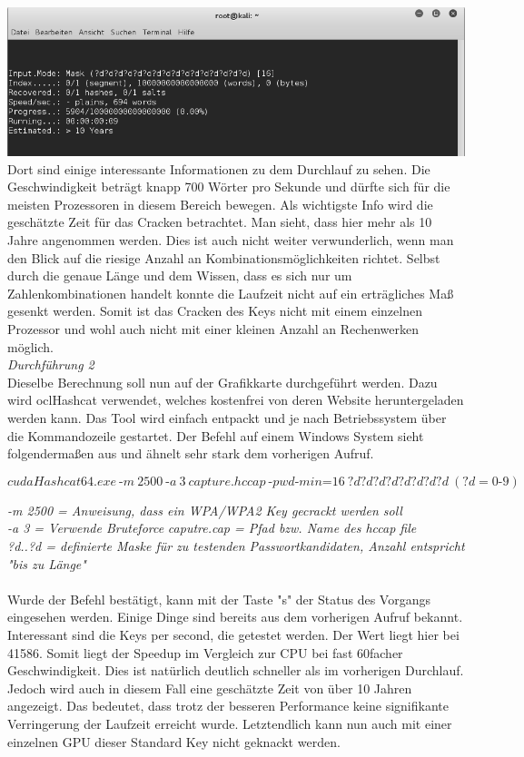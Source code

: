 \includegraphics[width=\textwidth]{bilder/wlan/wlan_screenshot_1.png}\\

Dort sind einige interessante Informationen zu dem Durchlauf zu sehen. Die Geschwindigkeit beträgt knapp 700 Wörter pro Sekunde und dürfte sich für die meisten Prozessoren in diesem Bereich bewegen.
Als wichtigste Info wird die geschätzte Zeit für das Cracken betrachtet. Man sieht, dass hier mehr als 10 Jahre angenommen werden. Dies ist auch nicht weiter verwunderlich, wenn man den Blick auf die riesige Anzahl an Kombinationsmöglichkeiten richtet. Selbst durch die genaue Länge und dem Wissen, dass es sich nur um Zahlenkombinationen handelt konnte die Laufzeit nicht auf ein erträgliches Maß gesenkt werden. Somit ist das Cracken des Keys nicht mit einem einzelnen Prozessor und wohl auch nicht mit einer kleinen Anzahl an Rechenwerken möglich.\\

\textit{Durchführung 2}\\

Dieselbe Berechnung soll nun auf der Grafikkarte durchgeführt werden. Dazu wird oclHashcat verwendet, welches kostenfrei von deren Website heruntergeladen werden kann. Das Tool wird einfach entpackt und je nach Betriebssystem über die Kommandozeile gestartet. Der Befehl auf einem Windows System sieht folgendermaßen aus und ähnelt sehr stark dem vorherigen Aufruf.

$$cudaHashcat64.exe~\text{-}m~2500~\text{-}a~3~capture.hccap~\text{-}pwd\text{-}min\text{=}16~?d?d?d?d?d?d?d?d~(?d = 0\text{-}9)$$

\textit{-m 2500 = Anweisung, dass ein WPA/WPA2 Key gecrackt werden soll}\\
\textit{-a 3 = Verwende Bruteforce}
\textit{caputre.cap = Pfad bzw. Name des hccap file}\\
\textit{?d..?d = definierte Maske für zu testenden Passwortkandidaten, Anzahl entspricht "bis zu Länge"\\}\\

Wurde der Befehl bestätigt, kann mit der Taste "s" der Status des Vorgangs eingesehen werden. Einige Dinge sind bereits aus dem vorherigen Aufruf bekannt. Interessant sind die Keys per second, die getestet werden. Der Wert liegt hier bei 41586. Somit liegt der Speedup im Vergleich zur CPU bei fast 60facher
Geschwindigkeit. Dies ist natürlich deutlich schneller als im vorherigen Durchlauf. Jedoch wird auch in diesem Fall eine geschätzte Zeit von über 10 Jahren angezeigt. Das bedeutet, dass trotz der besseren Performance keine signifikante Verringerung der Laufzeit erreicht wurde. 
Letztendlich kann nun auch mit einer einzelnen GPU dieser Standard Key nicht geknackt werden.\\

